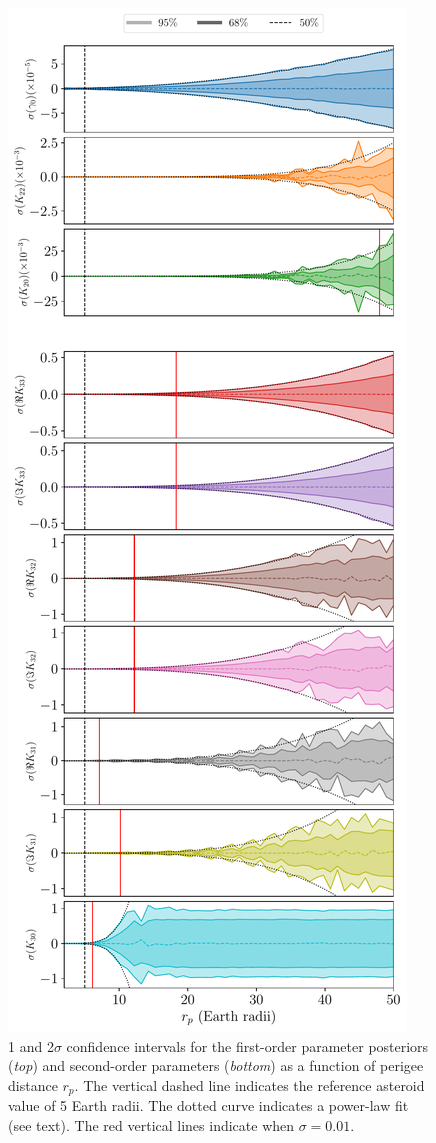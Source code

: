 \documentclass[fleqn,usenatbib]{mnras}
\begin{document}
\begin{figure}
  \centering
  \includegraphics[height=0.89\textheight]{figs/scan-perigee.pdf}
  \caption{1 and 2$\sigma$ confidence intervals for the first-order parameter posteriors (\textit{top}) and second-order parameters (\textit{bottom}) as a function of perigee distance $r_p$. The vertical dashed line indicates the reference asteroid value of 5 Earth radii. The dotted curve indicates a power-law fit (see text). The red vertical lines indicate when $\sigma = 0.01$.}
  \label{fig:scan-perigee}
\end{figure}
\end{document}
